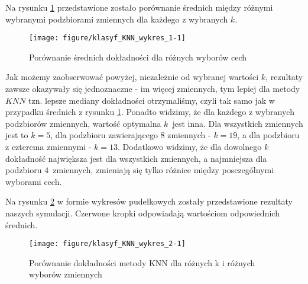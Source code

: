 \documentclass[12pt, a4paper]{article}\usepackage[]{graphicx}\usepackage[]{xcolor}
\makeatletter
\def\maxwidth{ %
  \ifdim\Gin@nat@width>\linewidth
    \linewidth
  \else
    \Gin@nat@width
  \fi
}
\newenvironment{knitrout}{}{} %
\makeatother
\begin{document}
Na rysunku \ref{fig:klasyf_KNN_wykres_1} przedstawione zostało porównanie średnich między różnymi wybranymi podzbiorami zmiennych dla każdego z wybranych $k$.

\begin{knitrout}
\color{fgcolor}\begin{figure}[H]

{\centering \texttt{[image: figure/klasyf\_KNN\_wykres\_1-1]} 

}

\caption[Porównanie średnich dokładności dla różnych wyborów cech]{Porównanie średnich dokładności dla różnych wyborów cech}\label{fig:klasyf_KNN_wykres_1}
\end{figure}

\end{knitrout}
Jak możemy zaobserwować powyżej, niezależnie od wybranej wartości $k$, rezultaty zawsze okazywały się jednoznaczne - im więcej zmiennych, tym lepiej dla metody $KNN$ tzn. lepsze mediany dokładności otrzymaliśmy, czyli tak samo jak w przypadku średnich z rysunku \ref{fig:klasyf_KNN_wykres_1}. Ponadto widzimy, że dla każdego z wybranych podzbiorów zmiennych, wartość optymalna $k$~jest inna. Dla wszystkich zmiennych jest to $k=5$, dla podzbioru zawierającego $8$ zmiennych - $k=19$, a dla podzbioru z czterema zmiennymi - $k=13$. Dodatkowo widzimy, że dla dowolnego $k$ dokładność największa jest dla wszystkich zmiennych, a najmniejsza dla podzbioru $4$~zmiennych, zmieniają się tylko różnice między posczególnymi wyborami cech.
\par

Na rysunku \ref{fig:klasyf_KNN_wykres_2} w formie wykresów pudełkowych zostały przedstawione rezultaty naszych symulacji. Czerwone kropki odpowiadają wartościom odpowiednich średnich.


\begin{knitrout}
\color{fgcolor}\begin{figure}[H]

{\centering \texttt{[image: figure/klasyf\_KNN\_wykres\_2-1]} 

}

\caption[Porównanie dokładności metody KNN dla różnych k i różnych wyborów zmiennych]{Porównanie dokładności metody KNN dla różnych k i różnych wyborów zmiennych}\label{fig:klasyf_KNN_wykres_2}
\end{figure}

\end{knitrout}
\end{document}
